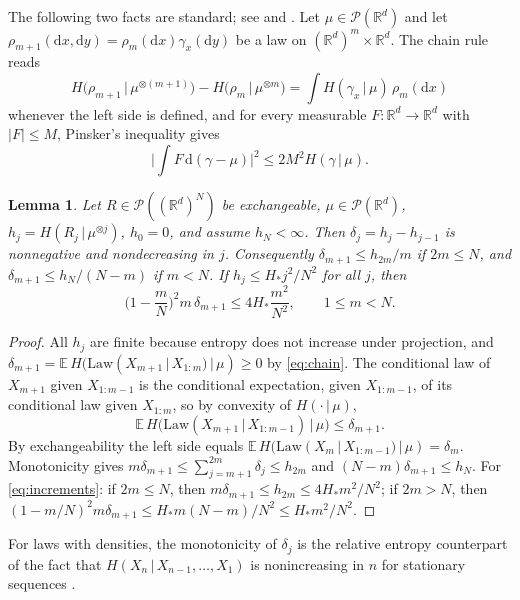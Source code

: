 \documentclass[11pt]{amsart}
\numberwithin{equation}{section}
\theoremstyle{plain}
\newtheorem{lemma}[theorem]{Lemma}
\theoremstyle{remark}
\newcommand{\R}{\mathbb{R}}
\newcommand{\E}{\mathbb{E}}
\newcommand{\cP}{\mathcal{P}}
\newcommand{\Law}{\mathrm{Law}}
\newcommand{\dd}{\mathrm{d}}
\begin{document}
The following two facts are standard; see \cite{CT06} and \cite[Section~4.3]{Lac23}. Let $\mu\in\cP(\R^d)$ and let $\rho_{m+1}(\dd x,\dd y)=\rho_m(\dd x)\gamma_x(\dd y)$ be a law on $(\R^d)^m\times\R^d$. The chain rule reads
\begin{equation}\label{eq:chain}
H\big(\rho_{m+1}\,\big|\,\mu^{\otimes(m+1)}\big)-H\big(\rho_m\,\big|\,\mu^{\otimes m}\big)=\int H(\gamma_x\,|\,\mu)\,\rho_m(\dd x)
\end{equation}
whenever the left side is defined, and for every measurable $F\colon\R^d\to\R^d$ with $|F|\le M$, Pinsker's inequality gives
\begin{equation}\label{eq:pinsker}
\Big|\int F\,\dd(\gamma-\mu)\Big|^2\le2M^2H(\gamma\,|\,\mu).
\end{equation}

\begin{lemma}\label{lem:increments}
Let $R\in\cP((\R^d)^N)$ be exchangeable, $\mu\in\cP(\R^d)$, $h_j=H(R_j\,|\,\mu^{\otimes j})$, $h_0=0$, and assume $h_N<\infty$. Then $\delta_j=h_j-h_{j-1}$ is nonnegative and nondecreasing in $j$. Consequently $\delta_{m+1}\le h_{2m}/m$ if $2m\le N$, and $\delta_{m+1}\le h_N/(N-m)$ if $m<N$. If $h_j\le H_*j^2/N^2$ for all $j$, then
\begin{equation}\label{eq:increments}
\Big(1-\frac mN\Big)^2m\,\delta_{m+1}\le4H_*\frac{m^2}{N^2},\qquad 1\le m<N.
\end{equation}
\end{lemma}

\begin{proof}
All $h_j$ are finite because entropy does not increase under projection, and $\delta_{m+1}=\E\,H(\Law(X_{m+1}\,|\,X_{1:m})\,|\,\mu)\ge0$ by \eqref{eq:chain}. The conditional law of $X_{m+1}$ given $X_{1:m-1}$ is the conditional expectation, given $X_{1:m-1}$, of its conditional law given $X_{1:m}$, so by convexity of $H(\cdot\,|\,\mu)$,
\[
\E\,H\big(\Law(X_{m+1}\,|\,X_{1:m-1})\,\big|\,\mu\big)\le\delta_{m+1}.
\]
By exchangeability the left side equals $\E\,H(\Law(X_m\,|\,X_{1:m-1})\,|\,\mu)=\delta_m$. Monotonicity gives $m\delta_{m+1}\le\sum_{j=m+1}^{2m}\delta_j\le h_{2m}$ and $(N-m)\delta_{m+1}\le h_N$. For \eqref{eq:increments}: if $2m\le N$, then $m\delta_{m+1}\le h_{2m}\le4H_*m^2/N^2$; if $2m>N$, then $(1-m/N)^2m\delta_{m+1}\le H_*m(N-m)/N^2\le H_*m^2/N^2$.
\end{proof}

For laws with densities, the monotonicity of $\delta_j$ is the relative entropy counterpart of the fact that $H(X_n\,|\,X_{n-1},\dots,X_1)$ is nonincreasing in $n$ for stationary sequences \cite[Theorem~4.2.2]{CT06}.
\end{document}
